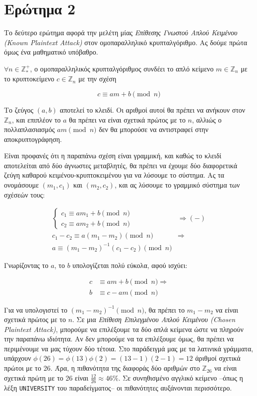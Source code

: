 \documentclass{article}
\begin{document}
\section*{Ερώτημα 2}

Το δεύτερο ερώτημα αφορά την μελέτη μίας \emph{Επίθεσης Γνωστού Απλού Κειμένου (Known Plaintext Attack)} στον ομοπαραλληλικό κρυπταλγόριθμο. Ας δούμε πρώτα όμως ένα μαθηματικό υπόβαθρο.

$\forall n \in \mathbb{Z}^+_*$, ο ομοπαραλληλικός κρυπταλγόριθμος συνδέει το απλό κείμενο $m \in \mathbb{Z}_n$ με το κρυπτοκείμενο $c \in \mathbb{Z}_n$ με την σχέση

$$c \equiv am + b \pmod n$$

Το ζεύγος $(a, b)$ αποτελεί το κλειδί. Οι αριθμοί αυτοί θα πρέπει να ανήκουν στον $\mathbb{Z}_n$, και επιπλέον το $a$ θα πρέπει να είναι σχετικά πρώτος με το $n$, αλλιώς ο πολλαπλασιασμός $am \pmod n$ δεν θα μπορούσε να αντιστραφεί στην αποκρυπτογράφηση.

Είναι προφανές ότι η παραπάνω σχέση είναι γραμμική, και καθώς το κλειδί αποτελείται από δύο άγνωστες μεταβλητές, θα πρέπει να έχουμε δύο διαφορετικά ζεύγη καθαρού κειμένου-κρυπτοκειμένου για να λύσουμε το σύστημα. Ας τα ονομάσουμε $(m_1, c_1)$ και $(m_2, c_2)$, και ας λύσουμε το γραμμικό σύστημα των σχέσεών τους:

\begin{equation} \label{crack_a}
\begin{split}
\begin{cases}
c_1 \equiv a m_1 + b \pmod n \\
c_2 \equiv a m_2 + b \pmod n
\end{cases} &\Rightarrow (-) \\
c_1 - c_2 \equiv a(m_1 - m_2) \pmod n &\Rightarrow \\
a \equiv (m_1 - m_2)^{-1} (c_1 - c_2) \pmod n
\end{split}
\end{equation}

Γνωρίζοντας το $a$, το $b$ υπολογίζεται πολύ εύκολα, αφού ισχύει:

\begin{align*}
c &\equiv am + b \pmod n \Rightarrow \\
b &\equiv c - am \pmod n
\end{align*}

Για να υπολογιστεί το $(m_1 - m_2)^{-1} \pmod n$, θα πρέπει το $m_1 - m_2$ να είναι σχετικά πρώτος με το $n$. Σε μια \emph{Επίθεση Επιλεγμένου Απλού Κειμένου (Chosen Plaintext Attack)}, μπορούμε να επιλέξουμε τα δύο απλά κείμενα ώστε να πληρούν την παραπάνω ιδιότητα. Αν δεν μπορούμε να τα επιλέξουμε όμως, θα πρέπει να περιμένουμε να μας τύχουν δύο τέτοια. Στο παράδειγμά μας με τα λατινικά γράμματα, υπάρχουν $\phi(26) = \phi(13)\phi(2) = (13-1)(2-1) = 12$ άριθμοί σχετικά πρώτοι με το 26. Άρα, η πιθανότητα της διαφοράς δύο αριθμών στο $\mathbb{Z}_{26}$ να είναι σχετικά πρώτη με το 26 είναι $\frac{12}{26} \approx 46\%$. Σε συνηθισμένο αγγλικό κείμενο --όπως η λέξη \texttt{UNIVERSITY} του παραδείγματος-- οι πιθανότητες αυξάνονται περισσότερο.
\end{document}
